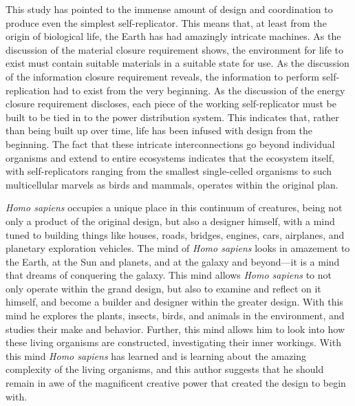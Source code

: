 This study has pointed to the immense amount of design and coordination 
to produce even the simplest self-replicator.  This means that, at least from the origin of 
biological life, the Earth has had amazingly intricate machines.  As the discussion of
the material closure requirement shows, the environment for life to exist must 
contain suitable materials in a suitable state for use.  As the discussion of the 
information closure requirement reveals, the information to perform self-replication
had to exist from the very beginning.  As the discussion of the energy closure 
requirement discloses, each piece of the working self-replicator must be built to be 
tied in to the power distribution system.  This indicates that, rather than being built up
over time, life has been infused with design from the beginning.  The fact that these
intricate interconnections go beyond individual organisms and extend to entire ecosystems
indicates that the ecosystem itself, with self-replicators ranging from the smallest
single-celled organisms to such multicellular marvels as birds and mammals, operates
within the original plan.

\textit{Homo sapiens} occupies a unique place in this continuum of creatures, being
not only a product of the original design, but also a designer himself, with a mind
tuned to building
things like houses, roads, bridges, engines, cars, airplanes, and planetary exploration
vehicles.  
The mind of \textit{Homo sapiens}
looks in amazement to the Earth, at the Sun and planets, and at the galaxy
and beyond---it is a mind that dreams of conquering the galaxy.
This mind allows \textit{Homo sapiens} to not only operate within the grand design,
but also to examine and reflect on it himself, and become a builder and designer 
within the greater design.
With this mind he explores the plants, insects, birds, and animals in
the environment, and studies their make and behavior.  Further, this mind
allows him to look
into how these living organisms are constructed, investigating their inner workings.
With this mind \textit{Homo sapiens} has learned and is learning about the amazing
complexity of the living organisms, and this author suggests that he
should remain in awe of the magnificent creative power that created the design to begin with.
